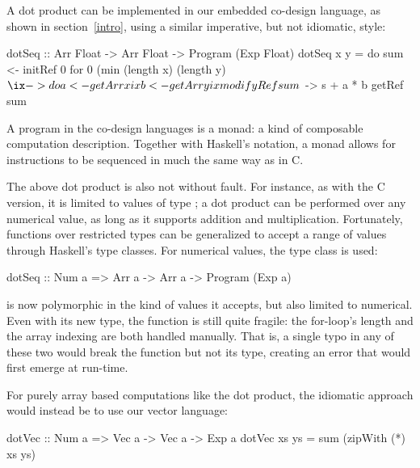 \documentclass[../paper.tex]{subfiles}
\begin{document}
A dot product can be implemented in our embedded co-design language, as shown in section~\ref{intro}, using a similar imperative, but not idiomatic, style:

\begin{code}
dotSeq :: Arr Float -> Arr Float -> Program (Exp Float)
dotSeq x y = do
  sum <- initRef 0
  for 0 (min (length x) (length y) $ \ix -> do
    a <- getArr x ix
    b <- getArr y ix
    modifyRef sum $ \s -> s + a * b
  getRef sum
\end{code}

\noindent A program in the co-design languages is a monad: a kind of composable computation description. Together with Haskell's  notation, a monad allows for instructions to be sequenced in much the same way as in C.

The above dot product is also not without fault. For instance, as with the C version, it is limited to values of type ; a dot product can be performed over any numerical value, as long as it supports addition and multiplication. Fortunately, functions over restricted types can be generalized to accept a range of values through Haskell's type classes. For numerical values, the type class  is used:


\begin{code}
dotSeq :: Num a => Arr a -> Arr a -> Program (Exp a)
\end{code}

\noindent {} is now polymorphic in the kind of values it accepts, but also limited to numerical. Even with its new type, the function is still quite fragile: the for-loop's length and the array indexing are both handled manually. That is, a single typo in any of these two would break the function but not its type, creating an error that would first emerge at run-time.

For purely array based computations like the dot product, the idiomatic approach would instead be to use our vector language:


\begin{code}
dotVec :: Num a => Vec a -> Vec a -> Exp a
dotVec xs ys = sum (zipWith (*) xs ys)
\end{code}
\end{document}
